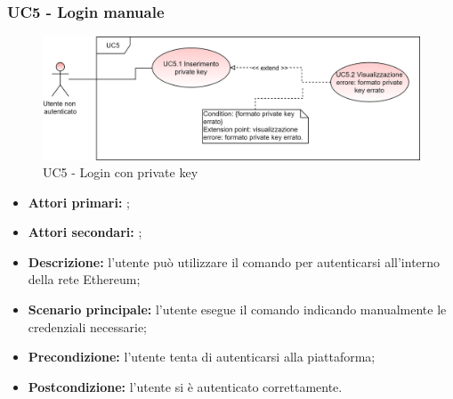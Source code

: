 \subsubsection{UC5 - Login manuale}
\begin{figure}[H]
	\centering
	\includegraphics[scale=\ucs]{./res/img/UC5.png}
	\caption {UC5 - Login con private key}
\end{figure}
\begin{itemize}
	\item \textbf{Attori primari:} \una{};
	\item \textbf{Attori secondari:} \re{};
	\item \textbf{Descrizione:} l’utente può utilizzare il comando \ploginPrivate{} per autenticarsi all’interno della rete Ethereum; 
	\item \textbf{Scenario principale:} l'utente esegue il comando \login{} indicando manualmente le credenziali necessarie; 
	\item \textbf{Precondizione:} l’utente tenta di autenticarsi alla piattaforma;
	\item \textbf{Postcondizione:} l’utente si è autenticato correttamente.
\end{itemize}
